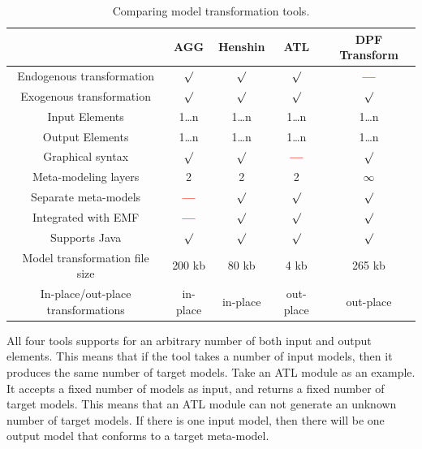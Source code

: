 \begin{table}[ht]
\renewcommand*\arraystretch{1.2}
\centering
\begin{tabular}{| c | c | c | c | c |}
\hline
& AGG & Henshin & ATL & DPF Transform \\
\hline
Endogenous transformation & $\surd$ & $\surd$ & $\surd$ & \textcolor{red}{\textbf{---}}\\

Exogenous transformation & $\surd$ & $\surd$ & $\surd$ & $\surd$\\

Input Elements & 1\ldots n & 1\ldots n & 1\ldots n & 1\ldots n\\

Output Elements & 1\ldots n & 1\ldots n & 1\ldots n & 1\ldots n\\

Graphical syntax & $\surd$ & $\surd$ & \textcolor{red}{\textbf{---}} & $\surd$
\\

Meta-modeling layers & 2 & 2 & 2 & $\infty$ \\

Separate meta-models & \textcolor{red}{\textbf{---}} &  $\surd$ &  $\surd$ &  $\surd$ \\

Integrated with EMF & \textcolor{red}{\textbf{---}} & $\surd$ & $\surd$ & $\surd$ \\ 

Supports Java & $\surd$ & $\surd$ & $\surd$ & $\surd$ \\ 

Model transformation file size & 200 kb & 80 kb & 4 kb & 265 kb\\

In-place/out-place transformations & in-place &
in-place & out-place  & out-place \\

\hline
\end{tabular}
\caption{Comparing model transformation tools.}
\label{tab:comparing}
\end{table} 

All four tools supports for an arbitrary number of both input and
output elements. This means that if the tool takes a number of input models, then it
produces the same number of target models. Take an ATL module as an example. It
accepts a fixed number of models as input, and returns a fixed number of target
models. This means that an ATL module can not generate an unknown number of
target models. If there is one input model, then there will be one output model
that conforms to a target meta-model.

